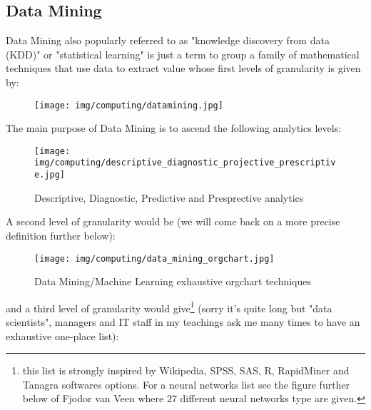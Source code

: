 	\subsection{Data Mining}\label{data mining}
	Data Mining also popularly referred to as "knowledge discovery from data (KDD)" or "statistical learning" is just a term to group a family of mathematical techniques that use data to extract value whose first levels of granularity is given by:
	\begin{figure}[H]
		\centering
		\texttt{[image: img/computing/datamining.jpg]}
	\end{figure}
	The main purpose of Data Mining is to ascend the following analytics levels:
	\begin{figure}[H]
		\centering
		\texttt{[image: img/computing/descriptive\_diagnostic\_projective\_prescriptive.jpg]}
		\caption{Descriptive, Diagnostic, Predictive and Presprective analytics}
	\end{figure}
	A second level of granularity would be (we will come back on a more precise definition further below):
	\begin{figure}[H]
		\centering
		\texttt{[image: img/computing/data\_mining\_orgchart.jpg]}
		\caption{Data Mining/Machine Learning exhaustive orgchart techniques}
	\end{figure}
	and a third level of granularity would give\footnote{this list is strongly inspired by Wikipedia, SPSS, SAS, R, RapidMiner and Tanagra softwares options. For a neural networks list see the figure further below of Fjodor van Veen where $27$ different neural networks type are given.} (sorry it's quite long but "data scientists", managers and IT staff in my teachings ask me many times to have an exhaustive one-place list):
